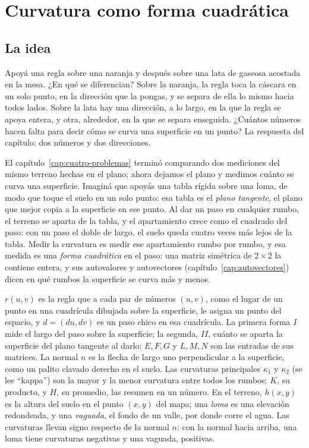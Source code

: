 \chapter{Curvatura como forma cuadrática}\label{cap:curvatura}

\section{La idea}

Apoyá una regla sobre una naranja y después sobre una lata de gaseosa acostada en la mesa.
¿En qué se diferencian? Sobre la naranja, la regla toca la cáscara en un solo punto, en la
dirección que la pongas, y se separa de ella lo mismo hacia todos lados. Sobre la lata hay una
dirección, a lo largo, en la que la regla se apoya entera, y otra, alrededor, en la que se
separa enseguida. ¿Cuántos números hacen falta para decir cómo se curva una superficie en un
punto? La respuesta del capítulo: dos números y dos direcciones.

El capítulo~\ref{cap:cuatro-problemas} terminó comparando dos mediciones del mismo terreno
hechas en el plano; ahora dejamos el plano y medimos cuánto se curva una superficie. Imaginá
que apoyás una tabla rígida sobre una loma, de modo que toque el suelo en un solo punto: esa
tabla es el \emph{plano tangente}, el plano que mejor copia a la superficie en ese punto. Al
dar un paso en cualquier rumbo, el terreno se aparta de la tabla, y el apartamiento crece como
el cuadrado del paso: con un paso el doble de largo, el suelo queda cuatro veces más lejos de
la tabla. Medir la curvatura es medir ese
apartamiento rumbo por rumbo, y esa medida es una \emph{forma cuadrática} en el paso: una matriz simétrica de \(2\times2\) la contiene entera,
y sus autovalores y autovectores (capítulo~\ref{cap:autovectores}) dicen en qué rumbos la
superficie se curva más y menos.

\(r(u,v)\) es la regla que a cada par de números \((u,v)\), como el lugar de un
punto en una cuadrícula dibujada sobre la superficie, le asigna un punto del espacio, y
\(d=(du,dv)\) es un paso chico en esa cuadrícula. La primera forma \(I\) mide el largo del paso
sobre la superficie; la segunda, \(II\), cuánto se aparta la superficie del plano tangente al
darlo; \(E,F,G\) y \(L,M,N\) son las entradas de sus matrices. La normal \(n\) es la flecha de
largo uno perpendicular a la superficie, como un palito clavado derecho en el suelo. Las
curvaturas principales \(\kappa_1\) y \(\kappa_2\) (se lee \enquote{kappa}) son la mayor y la
menor curvatura entre todos los rumbos; \(K\), su producto, y \(H\), su promedio, las resumen en
un número. En el terreno, \(h(x,y)\) es la altura del suelo en el punto \((x,y)\) del mapa; una
\emph{loma} es una elevación redondeada, y una \emph{vaguada}, el fondo de un valle, por donde
corre el agua. Las curvaturas llevan signo respecto de la normal \(n\): con la normal hacia
arriba, una loma tiene curvaturas negativas y una vaguada, positivas.


